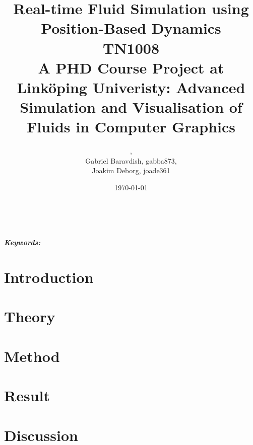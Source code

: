 \documentclass[a4paper, 11pt]{article} %
\title{\textbf{Real-time Fluid Simulation using Position-Based Dynamics}
\vspace{0.8cm}
\\
\small{TN1008}
\\
\small{A PHD Course Project at Linköping Univeristy:
Advanced Simulation and Visualisation of Fluids in Computer Graphics}
}
\author{\vspace{-1.2cm}{Niklas Andersson, nikan278},
\\{Gabriel Baravdish, gabba873},
\\{Joakim Deborg, joade361}}
\date{\today} %
\makeatletter
\providecommand{\keywords}[1]{\textbf{\textit{Keywords:}} #1}
\renewcommand{\maketitle}{ %
\begin{center}
{\LARGE\@title} %

\vspace{50pt} %

{\large\@author} %
\\\@date %

\vspace{40pt} %
\end{center}
}
\makeatother
\begin{document}
\maketitle %



\vspace{-1.2cm}

\begin{abstract}

\end{abstract}

\noindent \keywords{}

\vspace{30pt} %


\newpage

\tableofcontents

\newpage

\section{Introduction}


\section{Theory}


\section{Method}


\section{Result}


\newpage

\section{Discussion}



\newpage






\end{document}
